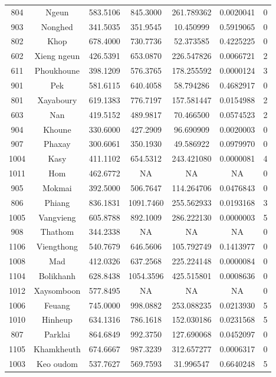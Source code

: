 \documentclass[
  letterpaper,
  DIV=11,
  numbers=noendperiod]{scrartcl}
\begin{document}
\begin{longtable}[]{@{}ccccccc@{}}
804 & Ngeun & 583.5106 & 845.3000 & 261.789362 & 0.0020041 & 0 \\
903 & Nonghed & 341.5035 & 351.9545 & 10.450999 & 0.5919065 & 0 \\
802 & Khop & 678.4000 & 730.7736 & 52.373585 & 0.4225225 & 0 \\
602 & Xieng ngeun & 426.5391 & 653.0870 & 226.547826 & 0.0066721 & 2 \\
611 & Phoukhoune & 398.1209 & 576.3765 & 178.255592 & 0.0000124 & 3 \\
901 & Pek & 581.6115 & 640.4058 & 58.794286 & 0.4682917 & 0 \\
801 & Xayaboury & 619.1383 & 776.7197 & 157.581447 & 0.0154988 & 2 \\
603 & Nan & 419.5152 & 489.9817 & 70.466500 & 0.0574523 & 2 \\
904 & Khoune & 330.6000 & 427.2909 & 96.690909 & 0.0020003 & 0 \\
907 & Phaxay & 300.6061 & 350.1930 & 49.586922 & 0.0979970 & 0 \\
1004 & Kasy & 411.1102 & 654.5312 & 243.421080 & 0.0000081 & 4 \\
1011 & Hom & 462.6772 & NA & NA & NA & 0 \\
905 & Mokmai & 392.5000 & 506.7647 & 114.264706 & 0.0476843 & 0 \\
806 & Phiang & 836.1831 & 1091.7460 & 255.562933 & 0.0193168 & 3 \\
1005 & Vangvieng & 605.8788 & 892.1009 & 286.222130 & 0.0000003 & 5 \\
908 & Thathom & 344.2338 & NA & NA & NA & 0 \\
1106 & Viengthong & 540.7679 & 646.5606 & 105.792749 & 0.1413977 & 0 \\
1008 & Mad & 412.0326 & 637.2568 & 225.224148 & 0.0000084 & 0 \\
1104 & Bolikhanh & 628.8438 & 1054.3596 & 425.515801 & 0.0008636 & 0 \\
1012 & Xaysomboon & 577.8495 & NA & NA & NA & 0 \\
1006 & Feuang & 745.0000 & 998.0882 & 253.088235 & 0.0213930 & 5 \\
1010 & Hinheup & 634.1316 & 786.1618 & 152.030186 & 0.0231568 & 5 \\
807 & Parklai & 864.6849 & 992.3750 & 127.690068 & 0.0452097 & 0 \\
1105 & Khamkheuth & 674.6667 & 987.3239 & 312.657277 & 0.0006317 & 0 \\
1003 & Keo oudom & 537.7627 & 569.7593 & 31.996547 & 0.6640248 & 5 \\

\end{longtable}
\end{document}
